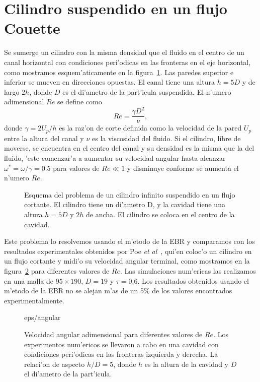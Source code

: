 \section{Cilindro suspendido en un flujo Couette}
\label{sec:couette}

Se sumerge un cilindro con la misma densidad que el fluido en   el centro de un canal horizontal
con  condiciones peri'odicas en las fronteras en el eje horizontal, como 
mostramos esquem'aticamente en la figura~\ref{fig:couette}. Las paredes superior e inferior
se mueven en direcciones opuestas. El canal tiene una altura $h=5D$ y de largo $2h$, donde
$D$ es el di'ametro de la part'icula suspendida. El n'umero adimensional $Re$
se define como
\begin{equation}\label{Re_c}
Re=\frac{\gamma D^2}{\nu},
\end{equation}
donde $\gamma=2U_p/h$ es la raz'on de corte definida como la velocidad de la pared $U_p$ entre la altura 
del canal y $\nu$  es la viscosidad del fluido.
Si el cilindro, libre de moverse, se encuentra en el centro del canal y su densidad es la misma
que la del fluido, 'este comenzar'a a aumentar su velocidad
angular hasta alcanzar  $\omega^\ast=\omega/\gamma= 0.5$ para 
valores de $Re \ll 1$  y disminuye conforme se aumenta el n'umero $Re$. 


\begin{figure}

\vskip 1cm
\caption{\label{fig:couette}
Esquema del problema de un cilindro infinito suspendido en un flujo cortante. El cilindro
tiene un di'ametro D, y la cavidad tiene una altura $h=5D$ y $2h$ de ancha. El cilindro
se coloca en el centro de la cavidad.
}
\end{figure}


Este problema lo resolvemos usando el m'etodo de la EBR y comparamos con los resultados experimentales obtenidos por 
Poe {\it et al}~\cite{poe75}, qui'en coloc'o un cilindro en un flujo cortante y midi'o su 
velocidad angular terminal, como mostramos en la figura~\ref{fig:w} para diferentes valores de $Re$. 
Las simulaciones num'ericas las realizamos en una malla de $95 \times 190$, $D=19$  y $\tau=0.6$. Los resultados
obtenidos usando el m'etodo de la EBR no se alejan m'as de un 5\% de los valores encontrados experimentalmente.
\begin{figure}
 {eps/angular}
\caption{\label{fig:w} 
Velocidad angular adimensional para diferentes valores de $Re$. Los experimentos num'ericos
se llevaron a cabo en una cavidad con condiciones peri'odicas en las fronteras izquierda y derecha.
La relaci'on de aspecto $h/D = 5$, donde $h$ es la altura de la cavidad y $D$ el di'ametro de la
part'icula.
}
\end{figure}




